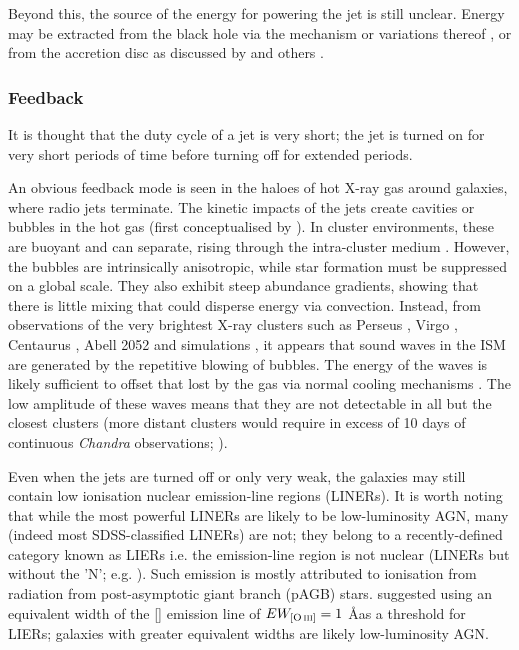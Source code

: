 			Beyond this, the source of the energy for powering the jet is still unclear. Energy may be extracted from the black hole via the \citet{Blandford1977} mechanism or variations thereof \citep[e.g.][]{Koide2002}, or from the accretion disc as discussed by \citet{Blandford1982} and others \citep[e.g.][]{Hujeirat2003}. 

		\subsubsection{Feedback}
			\label{subsubsection:JetFeedback}
			It is thought that the duty cycle of a jet is very short; the jet is turned on for very short periods of time before turning off for extended periods. 

			An obvious feedback mode is seen in the haloes of hot X-ray gas around galaxies, where radio jets terminate. The kinetic impacts of the jets create cavities or bubbles in the hot gas (first conceptualised by \citealt{Gull1973}). In cluster environments, these are buoyant and can separate, rising through the intra-cluster medium \citep[e.g.][]{Churazov2000, Churazov2001, McNamara2000}. However, the bubbles are intrinsically anisotropic, while star formation must be suppressed on a global scale. They also exhibit steep abundance gradients, showing that there is little mixing that could disperse energy via convection. Instead, from observations of the very brightest X-ray clusters such as Perseus \citep{Fabian2003, Fabian2006}, Virgo \citep{Forman2007}, Centaurus \citep{Sanders2008}, Abell 2052 \citep{Blanton2011} and simulations \citep[e.g.][]{Ruszkowski2004, Sijacki2006}, it appears that sound waves in the ISM are generated by the repetitive blowing of bubbles. The energy of the waves is likely sufficient to offset that lost by the gas via normal cooling mechanisms \citep{Fabian2003}. The low amplitude of these waves means that they are not detectable in all but the closest clusters (more distant clusters would require in excess of 10 days of continuous \textit{Chandra} observations; \citealt{Graham2008}).

			Even when the jets are turned off or only very weak, the galaxies may still contain low ionisation nuclear emission-line regions (LINERs). It is worth noting that while the most powerful LINERs are likely to be low-luminosity AGN, many (indeed most SDSS-classified LINERs) are not; they belong to a recently-defined category known as LIERs i.e. the emission-line region is not nuclear (LINERs but without the 'N'; e.g. \citealt{Sarzi2005, Sarzi2010, Singh2013, Belfiore2016a}). Such emission is mostly attributed to ionisation from radiation from post-asymptotic giant branch (pAGB) stars. \citet{Capetti2011} suggested using an equivalent width of the [] emission line of $EW_\text{[\ion{O}{iii}]} = 1$ \AA  as a threshold for LIERs; galaxies with greater equivalent widths are likely low-luminosity AGN.

